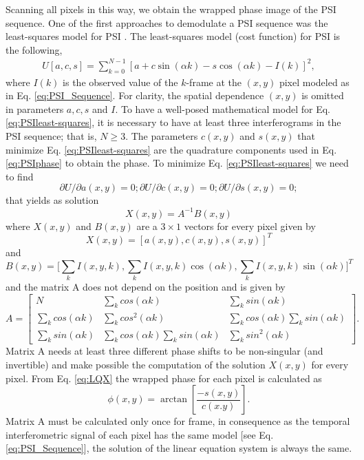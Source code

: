 Scanning all pixels in this way, we obtain the wrapped phase image of
the PSI sequence. One of the first approaches to demodulate a PSI
sequence was the least-squares model for PSI
\cite{Morgan,Greivenkamp,Okada,Kong}. The least-squares model (cost function) 
for PSI is the following,
\begin{align}\label{eq:PSIleast-squares}
  U[a,c,s]= \sum_{k=0}^{N-1}\left[a + c \sin(\alpha k)\right.
  -\left. s \cos(\alpha k)-I(k) \right]^2,
\end{align}
where $I(k)$ is the observed value of the $k$-frame at the
$(x,y)$ pixel modeled as in Eq. \eqref{eq:PSI_Sequence}. For clarity, 
the spatial dependence $(x,y)$ is omitted in parameters $a,c,s$ and $I$.
To have a well-posed mathematical model for Eq. \eqref{eq:PSIleast-squares},
it is necessary to have at least three interferograms in the PSI sequence;
that is, $N\geq 3$. The parameters $c(x,y)$ and $s(x,y)$ that minimize Eq. 
\eqref{eq:PSIleast-squares} are the quadrature components used in Eq. 
\eqref{eq:PSIphase} to obtain the phase. To minimize Eq. 
\eqref{eq:PSIleast-squares} we need to find
\begin{equation}
 \partial U/ \partial a(x,y)=0; \partial U/ \partial c(x,y)=0; 
\partial U/ \partial s(x,y)=0;
\end{equation}
that yields as solution
\begin{equation}
 X(x,y)=A^{-1}B(x,y)
\end{equation}
where $X(x,y)$ and $B(x,y)$ are a $3 \times 1$ vectors for every pixel given by
\begin{equation}\label{eq:LQX}
 X(x,y)=[a(x,y),c(x,y),s(x,y)]^T
\end{equation}
and
\begin{equation}
 B(x,y)=\bigg[\sum_k I(x,y,k),\sum_k I(x,y,k) \cos(\alpha k),
 \sum_k I(x,y,k) \sin(\alpha k) \bigg]^T
\end{equation}
and the matrix A does not depend on the position and is given by
\begin{equation}
A=\left[\begin{array}{ccc}
N & \sum_{k}cos(\alpha k) & \sum_{k}sin(\alpha k)\\
\sum_{k}cos(\alpha k) & \sum_{k}cos^{2}(\alpha k) & \sum_{k}cos(\alpha k)
\sum_{k}sin(\alpha k)\\
\sum_{k}sin(\alpha k) & \sum_{k}cos(\alpha k)\sum_{k}sin(\alpha k) & 
\sum_{k}sin^{2}(\alpha k)\end{array}\right].
\end{equation}
Matrix A needs at least three different phase shifts to be non-singular (and 
invertible) and make possible the computation of the solution $X(x,y)$ for every
pixel. From Eq. \eqref{eq:LQX} the wrapped phase for each pixel is calculated as
\begin{equation}
 \phi(x,y)=\arctan\left[\frac{-s(x,y)}{c(x.y)} \right].
\end{equation}
Matrix A must be calculated only once for frame, in consequence as the temporal 
interferometric signal of each pixel has the same model 
[see Eq. \eqref{eq:PSI_Sequence}], the solution of the linear equation system is 
always the same.

